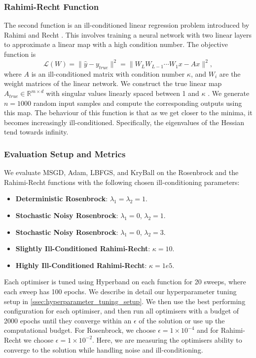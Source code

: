 \subsubsection{Rahimi-Recht Function}
\label{sssec:task_1_rahimi_recht_function}
The second function is an ill-conditioned linear regression problem introduced by Rahimi and Recht \citep{recht2017kitchen}. This involves training a neural network with two linear layers to approximate a linear map with a high condition number. The objective function is
\begin{equation}
\mathcal{L}(W) = \|\hat{y} - y_{true}\|^2 = \|W_L W_{L-1} \cdots W_1 x - Ax\|^2, 
\end{equation}
where $A$ is an ill-conditioned matrix with condition number $\kappa$, and $W_i$ are the weight matrices of the linear network. We construct the true linear map $A_{true} \in \mathbb{R}^{m \times d}$ with singular values linearly spaced between 1 and $\kappa$ \citep{recht2017kitchen}. We generate $n=1000$ random input samples and compute the corresponding outputs using this map. The behaviour of this function is that as we get closer to the minima, it becomes increasingly ill-conditioned. Specifically, the eigenvalues of the Hessian tend towards infinity.

\subsubsection{Evaluation Setup and Metrics}
\label{sssec:task_1_evaluation_setup_and_metrics}
We evaluate MSGD, Adam, LBFGS, and KryBall on the Rosenbrock and the Rahimi-Recht functions with the following chosen ill-conditioning parameters:
\begin{itemize}
    \item \textbf{Deterministic Rosenbrock}: $\lambda_1 = \lambda_2 = 1$.
    \item \textbf{Stochastic Noisy Rosenbrock}: $\lambda_1 = 0$, $\lambda_2 = 1$.
    \item \textbf{Stochastic Noisy Rosenbrock}: $\lambda_1 = 0$, $\lambda_2 = 3$.
    \item \textbf{Slightly Ill-Conditioned Rahimi-Recht}: $\kappa = 10$.
    \item \textbf{Highly Ill-Conditioned Rahimi-Recht}: $\kappa = 1e5$.
\end{itemize}
Each optimiser is tuned using Hyperband on each function for 20 sweeps, where each sweep has 100 epochs. We describe in detail our hyperparameter tuning setup in \cref{ssec:hyperparameter_tuning_setup}. We then use the best performing configuration for each optimiser, and then run all optimisers with a budget of 2000 epochs until they converge within an $\epsilon$ of the solution or use up the computational budget. For Rosenbrock, we choose $\epsilon = 1 \times 10^{-4}$ and for Rahimi-Recht we choose $\epsilon = 1 \times 10^{-2}$. Here, we are measuring the optimisers ability to converge to the solution while handling noise and ill-conditioning.

